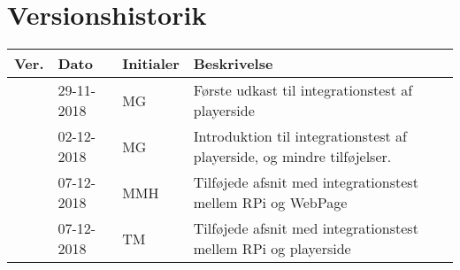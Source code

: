 \documentclass[Integrationstest/Integrationstest_main.tex]{subfiles}
\begin{document}
\section{Versionshistorik}
\begin{longtable}{|L{0.07\textwidth}|L{0.15\textwidth}|L{0.13\textwidth}|L{0.55\textwidth}|}
        \hline
        \textbf{Ver.} & \textbf{Dato} & \textbf{Initialer} & \textbf{Beskrivelse}  \\ \hline
        & 29-11-2018 & MG & Første udkast til integrationstest af playerside \\ \hline
        & 02-12-2018 & MG & Introduktion til integrationstest af playerside, og mindre tilføjelser. \\ \hline 
        & 07-12-2018 & MMH & Tilføjede afsnit med integrationstest mellem RPi og WebPage \\ \hline
        & 07-12-2018 & TM & Tilføjede afsnit med integrationstest mellem RPi og playerside \\ \hline
\end{longtable}
\end{document}
